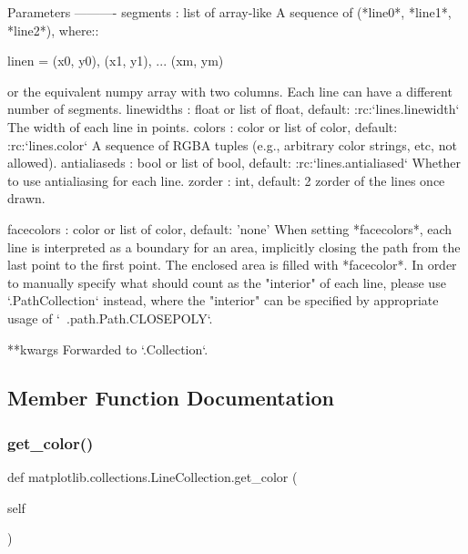 \begin{DoxyVerb}Parameters
----------
segments : list of array-like
    A sequence of (*line0*, *line1*, *line2*), where::

linen = (x0, y0), (x1, y1), ... (xm, ym)

    or the equivalent numpy array with two columns. Each line
    can have a different number of segments.
linewidths : float or list of float, default: :rc:`lines.linewidth`
    The width of each line in points.
colors : color or list of color, default: :rc:`lines.color`
    A sequence of RGBA tuples (e.g., arbitrary color strings, etc, not
    allowed).
antialiaseds : bool or list of bool, default: :rc:`lines.antialiased`
    Whether to use antialiasing for each line.
zorder : int, default: 2
    zorder of the lines once drawn.

facecolors : color or list of color, default: 'none'
    When setting *facecolors*, each line is interpreted as a boundary
    for an area, implicitly closing the path from the last point to the
    first point. The enclosed area is filled with *facecolor*.
    In order to manually specify what should count as the "interior" of
    each line, please use `.PathCollection` instead, where the
    "interior" can be specified by appropriate usage of
    `~.path.Path.CLOSEPOLY`.

**kwargs
    Forwarded to `.Collection`.
\end{DoxyVerb}
 

\subsection{Member Function Documentation}
\mbox{\label{classmatplotlib_1_1collections_1_1LineCollection_a5198841f2dfd098c4212d5923ec8e581}} 
\subsubsection{\texorpdfstring{get\+\_\+color()}{get\_color()}}
{\footnotesize\ttfamily def matplotlib.\+collections.\+Line\+Collection.\+get\+\_\+color (\begin{DoxyParamCaption}\item[{}]{self }\end{DoxyParamCaption})}

